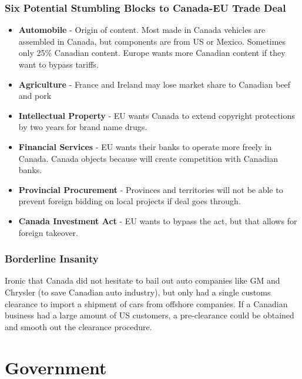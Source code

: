 \documentclass[english, 12pt]{article}
\begin{document}
\subsubsection*{Six Potential Stumbling Blocks to Canada-EU Trade Deal}
\begin{itemize}
\item \textbf{Automobile} - Origin of content. Most made in Canada vehicles are assembled in Canada, but components are from US or Mexico. Sometimes only 25\% Canadian content. Europe wants more Canadian content if they want to bypass tariffs.
\item \textbf{Agriculture} - France and Ireland may lose market share to Canadian beef and pork
\item \textbf{Intellectual Property} - EU wants Canada to extend copyright protections by two years for brand name drugs.
\item \textbf{Financial Services} - EU wants their banks to operate more freely in Canada. Canada objects because will create competition with Canadian banks.
\item \textbf{Provincial Procurement} - Provinces and territories will not be able to prevent foreign bidding on local projects if deal goes through.
\item \textbf{Canada Investment Act} - EU wants to bypass the act, but that allows for foreign takeover.
\end{itemize}
\subsubsection*{Borderline Insanity}
Ironic that Canada did not hesitate to bail out auto companies like GM and Chrysler (to save Canadian auto industry), but only had a single customs clearance to import a shipment of cars from offshore companies. If a Canadian business had a large amount of US customers, a pre-clearance could be obtained and smooth out the clearance procedure.

\section{Government}
\end{document}
